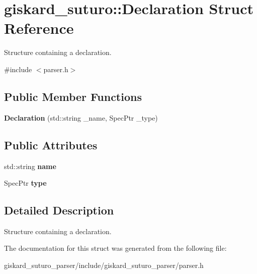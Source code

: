 \hypertarget{structgiskard__suturo_1_1Declaration}{\section{giskard\-\_\-suturo\-:\-:Declaration Struct Reference}
\label{structgiskard__suturo_1_1Declaration}
}


Structure containing a declaration.  




{\ttfamily \#include $<$parser.\-h$>$}

\subsection*{Public Member Functions}
\begin{DoxyCompactItemize}
\item 
\hypertarget{structgiskard__suturo_1_1Declaration_ac9e40e3addb187fbf764e6bf9e9453a7}{{\bfseries Declaration} (std\-::string \-\_\-name, Spec\-Ptr \-\_\-type)}\label{structgiskard__suturo_1_1Declaration_ac9e40e3addb187fbf764e6bf9e9453a7}

\end{DoxyCompactItemize}
\subsection*{Public Attributes}
\begin{DoxyCompactItemize}
\item 
\hypertarget{structgiskard__suturo_1_1Declaration_a66142005ced1a5b5e8f240fb7c6c1fbd}{std\-::string {\bfseries name}}\label{structgiskard__suturo_1_1Declaration_a66142005ced1a5b5e8f240fb7c6c1fbd}

\item 
\hypertarget{structgiskard__suturo_1_1Declaration_a80f34f240231a669bf8cd2a56d05c0a9}{Spec\-Ptr {\bfseries type}}\label{structgiskard__suturo_1_1Declaration_a80f34f240231a669bf8cd2a56d05c0a9}

\end{DoxyCompactItemize}


\subsection{Detailed Description}
Structure containing a declaration. 

The documentation for this struct was generated from the following file\-:\begin{DoxyCompactItemize}
\item 
giskard\-\_\-suturo\-\_\-parser/include/giskard\-\_\-suturo\-\_\-parser/parser.\-h\end{DoxyCompactItemize}
